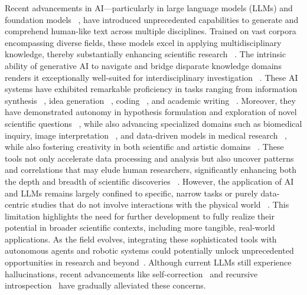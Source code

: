 Recent advancements in AI—particularly in large language models (LLMs) and foundation models ~\cite{wang2024survey}, have introduced unprecedented capabilities to generate and comprehend human-like text across multiple disciplines. Trained on vast corpora encompassing diverse fields, these models excel in applying multidisciplinary knowledge, thereby substantially enhancing scientific research ~\cite{bommasani2021opportunities,huang2024position,lu2024ai}. The intrinsic ability of generative AI to navigate and bridge disparate knowledge domains renders it exceptionally well-suited for interdisciplinary investigation ~\cite{li2024academic,mallapaty2024can}. These AI systems have exhibited remarkable proficiency in tasks ranging from information synthesis ~\cite{kang2024researcharena}, idea generation ~\cite{wang2019paperrobot, baek2024researchagent, si2024llmideas, hu2024nova}, coding ~\cite{jiang2024survey}, and academic writing ~\cite{elbanna2024exploring, lehr2024chatgpt}. Moreover, they have demonstrated autonomy in hypothesis formulation and exploration of novel scientific questions ~\cite{zenil2023future}, while also advancing specialized domains such as biomedical inquiry, image interpretation ~\cite{tu2024towardsbiomedical}, and data-driven models in medical research ~\cite{gao2024empowering}, while also fostering creativity in both scientific and artistic domains ~\cite{mediawingstrom2024redefining}. These tools not only accelerate data processing and analysis but also uncover patterns and correlations that may elude human researchers, significantly enhancing both the depth and breadth of scientific discoveries ~\cite{shir2024towards, gottweis2025towards}. However, the application of AI and LLMs remains largely confined to specific, narrow tasks or purely data-centric studies that do not involve interactions with the physical world ~\cite{lu2024ai}. This limitation highlights the need for further  development to fully realize their potential in broader scientific contexts, including more tangible, real-world applications. As the field evolves, integrating these sophisticated tools with autonomous agents and robotic systems could potentially unlock unprecedented opportunities in research and beyond~\cite{jang2024unlocking}. 
Although current LLMs still experience hallucinations, recent advancements like self-correction~\cite{kumar2024training} and recursive introspection~\cite{qu2024recursive} have gradually alleviated these concerns.

